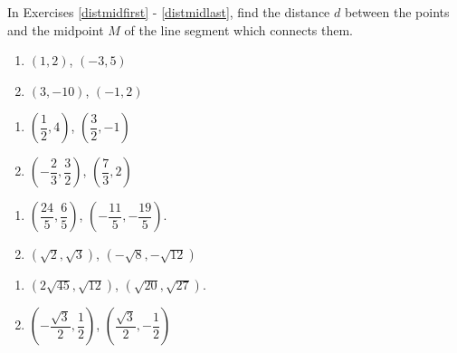 \documentclass{ximera}
\begin{document}
In Exercises \ref{distmidfirst} - \ref{distmidlast}, find the distance $d$ between the points and the midpoint $M$ of the line segment which connects them.


\begin{multicols}{2}
\begin{enumerate}
\setcounter{enumi}{\value{HW}}

\item $(1,2)$, $(-3,5)$ \label{distmidfirst}
\item $(3, -10)$, $(-1, 2)$ 

\setcounter{HW}{\value{enumi}}
\end{enumerate}
\end{multicols}

\begin{multicols}{2}
\begin{enumerate}
\setcounter{enumi}{\value{HW}}

\item $\left( \dfrac{1}{2}, 4\right)$, $\left(\dfrac{3}{2}, -1\right)$ 
\item $\left(- \dfrac{2}{3}, \dfrac{3}{2} \right)$, $\left(\dfrac{7}{3}, 2\right)$ 

\setcounter{HW}{\value{enumi}}
\end{enumerate}
\end{multicols}


\begin{multicols}{2}
\begin{enumerate}
\setcounter{enumi}{\value{HW}}

\item  $\left( \dfrac{24}{5}, \dfrac{6}{5} \right)$, $\left( -\dfrac{11}{5}, -\dfrac{19}{5} \right)$.
\item $\left(\sqrt{2}, \sqrt{3}\right)$, $\left(-\sqrt{8}, -\sqrt{12}\right)$ 

\setcounter{HW}{\value{enumi}}
\end{enumerate}
\end{multicols}

\begin{multicols}{2}
\begin{enumerate}
\setcounter{enumi}{\value{HW}}

\item  $\left(2 \sqrt{45}, \sqrt{12} \right)$, $\left(\sqrt{20}, \sqrt{27} \right)$. 
\item $\left(-\dfrac{\sqrt{3}}{2}, \dfrac{1}{2} \right)$, $\left(\dfrac{\sqrt{3}}{2}, -\dfrac{1}{2} \right)$ \label{distmidlast}

\setcounter{HW}{\value{enumi}}
\end{enumerate}
\end{multicols}
\end{document}
